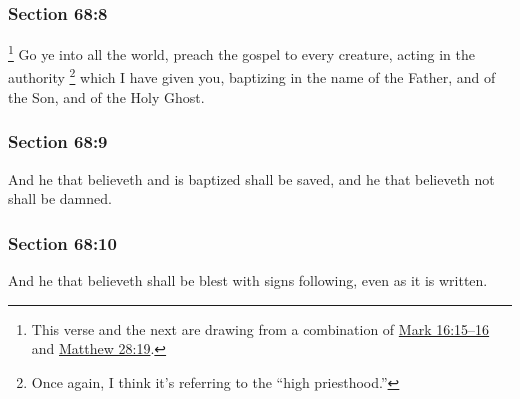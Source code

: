 	\subsubsection{Section 68:8} %
		\label{DC68-8}

			\footnote{%
				This verse and the next are drawing from a combination of \hyperref[MARK-16-15]{Mark 16:15--16} and \hyperref[MATTHEW-28-19]{Matthew 28:19}.
				}%
		Go ye into all the world, preach the gospel to every creature, acting in the authority%
		\footnote{%
			Once again, I think it's referring to the ``high priesthood.''
			} 
		which I have given you, baptizing in the name of the Father, and of the Son, and of the Holy Ghost.


	\subsubsection{Section 68:9} %
		\label{DC68-9}

		And he that believeth and is baptized shall be saved, and he that believeth not shall be damned.


	\subsubsection{Section 68:10} %
		\label{DC68-10}

		And he that believeth shall be blest with signs following, even as it is written.


